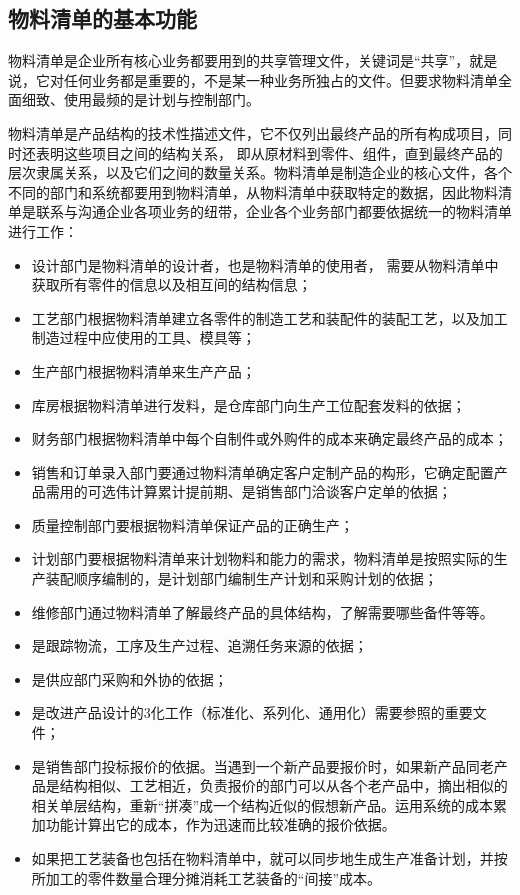 \subsection {物料清单的基本功能}

    物料清单是企业所有核心业务都要用到的共享管理文件，关键词是“共享”，就是说，它对任何业务都是重要的，不是某一种业务所独占的文件。但要求物料清单全面细致、使用最频的是计划与控制部门。

    物料清单是产品结构的技术性描述文件，它不仅列出最终产品的所有构成项目，同时还表明这些项目之间的结构关系， 即从原材料到零件、组件，直到最终产品的层次隶属关系，以及它们之间的数量关系。物料清单是制造企业的核心文件，各个不同的部门和系统都要用到物料清单，从物料清单中获取特定的数据，因此物料清单是联系与沟通企业各项业务的纽带，企业各个业务部门都要依据统一的物料清单进行工作：

    \begin{itemize}
        \item  设计部门是物料清单的设计者，也是物料清单的使用者， 需要从物料清单中获取所有零件的信息以及相互间的结构信息；
        \item  工艺部门根据物料清单建立各零件的制造工艺和装配件的装配工艺，以及加工制造过程中应使用的工具、模具等；
        \item  生产部门根据物料清单来生产产品；
        \item  库房根据物料清单进行发料，是仓库部门向生产工位配套发料的依据；
        \item  财务部门根据物料清单中每个自制件或外购件的成本来确定最终产品的成本；
        \item  销售和订单录入部门要通过物料清单确定客户定制产品的构形，它确定配置产品需用的可选伟计算累计提前期、是销售部门洽谈客户定单的依据；
        \item  质量控制部门要根据物料清单保证产品的正确生产；
        \item 计划部门要根据物料清单来计划物料和能力的需求，物料清单是按照实际的生产装配顺序编制的，是计划部门编制生产计划和采购计划的依据；
        \item  维修部门通过物料清单了解最终产品的具体结构，了解需要哪些备件等等。
        \item 是跟踪物流，工序及生产过程、追溯任务来源的依据；
        \item 是供应部门采购和外协的依据；
        \item 是改进产品设计的3化工作（标准化、系列化、通用化）需要参照的重要文件；
        \item 是销售部门投标报价的依据。当遇到一个新产品要报价时，如果新产品同老产品是结构相似、工艺相近，负责报价的部门可以从各个老产品中，摘出相似的相关单层结构，重新“拼凑”成一个结构近似的假想新产品。运用系统的成本累加功能计算出它的成本，作为迅速而比较准确的报价依据。
        \item 如果把工艺装备也包括在物料清单中，就可以同步地生成生产准备计划，并按所加工的零件数量合理分摊消耗工艺装备的“间接”成本。
    \end{itemize}

